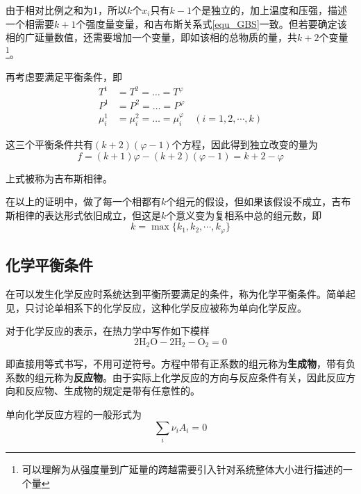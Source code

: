 \documentclass[UTF8]{ctexart}
\begin{document}
	由于相对比例之和为1，所以$ k $个$ x_{i} $只有$ k-1 $个是独立的，加上温度和压强，描述一个相需要$ k+1 $个强度量变量，和吉布斯关系式\ref{equ_GBS}一致。但若要确定该相的广延量数值，还需要增加一个变量，即如该相的总物质的量，共$ k+2 $个变量\footnote{可以理解为从强度量到广延量的跨越需要引入针对系统整体大小进行描述的一个量}。
	
	再考虑要满足平衡条件，即
	\begin{equation}
	\begin{aligned}
	T^{1}&=T^{2}=\dots=T^{\varphi}
	\\
	P^{1}&=P^{2}=\dots=P^{\varphi}
	\\
	\mu^{1}_{i}&=\mu^{2}_{i}=\dots=\mu^{\varphi}_{i} \quad (i=1,2,\cdots,k)
	\end{aligned}
	\end{equation}
	
\noindent 这三个平衡条件共有$ (k+2)(\varphi-1) $个方程，因此得到独立改变的量为
\begin{equation}
f=(k+1) \varphi-(k+2)(\varphi-1) =k+2-\varphi
\end{equation}

\noindent 上式被称为吉布斯相律。

	在以上的证明中，做了每一个相都有$ k $个组元的假设，但如果该假设不成立，吉布斯相律的表达形式依旧成立，但这是$ k $个意义变为复相系中总的组元数，即
	\begin{equation}
		k=\max \{k_{1},k_{2},\cdots,k_{\varphi}\}
	\end{equation}
	
	\subsection{化学平衡条件}
	在可以发生化学反应时系统达到平衡所要满足的条件，称为化学平衡条件。简单起见，只讨论单相系下的化学反应，这种化学反应被称为单向化学反应。
	
	对于化学反应的表示，在热力学中写作如下模样
	\begin{equation}
	2 \mathrm{H}_{2} \mathrm{O}-2 \mathrm{H}_{2}-\mathrm{O}_{2}=0
	\end{equation}
	
\noindent 即直接用等式书写，不用可逆符号。方程中带有正系数的组元称为\textbf{生成物}，带有负系数的组元称为\textbf{反应物}。由于实际上化学反应的方向与反应条件有关，因此反应方向和反应物、生成物的规定是带有任意性的。

	单向化学反应方程的一般形式为
	\begin{equation}
	\sum_{i} \nu_{i} A_{i}=0
	\end{equation}
\end{document}
